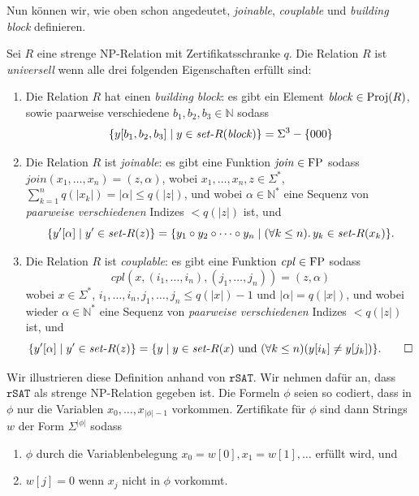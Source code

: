 Nun können wir, wie oben schon angedeutet, \emph{joinable}, \emph{couplable} und \emph{building block} definieren.
\begin{definition}\label{def:universal}
    Sei $R$ eine strenge NP-Relation mit Zertifikatsschranke $q$.
    Die Relation $R$ ist \emph{universell} wenn alle drei folgenden Eigenschaften erfüllt sind:
    \begin{enumerate}
        \item Die Relation $R$ hat einen \emph{building block}:  es gibt ein Element $\mathit{block}\in\operatorname{Proj}(R)$, sowie paarweise verschiedene $b_1,b_2,b_3\in\mathbb N$ sodass
            \[\{ y[b_1,b_2,b_3] \mid y\in \mathit{set}\text{-}{}R(\mathit{block}) \} = \Sigma^3 - \{000\} \]
        \item Die Relation $R$ ist \emph{joinable}: es gibt eine Funktion $\mathit{join}\in \mathrm{FP}$ sodass
           $ \mathit{join}(x_1, \dots, x_n) = (z, \alpha)$, wobei $x_1, \ldots, x_n, z\in \Sigma^*$, $\sum_{k=1}^n q(|x_k|)=|\alpha|\leq q(|z|)$, und
            wobei $\alpha\in \mathbb N^*$ eine Sequenz von \emph{paarweise verschiedenen} Indizes $<q(|z|)$ ist, und
            \begin{equation*} \{ y'[\alpha] \mid y' \in \mathit{set}\text{-}{}R(z)\} = \{ y_1\circ y_2 \circ \cdots \circ y_n \mid (\forall k\leq n).\, y_k \in \mathit{set}\text{-}{}R(x_k) \}. \end{equation*}
        \item Die Relation $R$ ist \emph{couplable}: es gibt eine Funktion $\mathit{cpl}\in \mathrm{FP}$ sodass
            \[  \mathit{cpl}(x, (i_1, \ldots, i_n), (j_1, \ldots, j_n)) = (z, \alpha) \]
        wobei $x\in\Sigma^*$, $i_1, \ldots, i_n, j_1,\ldots, j_n \leq q(|x|)-1$ und $|\alpha|=q(|x|)$, und
            wobei wieder $\alpha\in \mathbb N^*$ eine Sequenz von \emph{paarweise verschiedenen} Indizes $<q(|z|)$ ist, und
            \begin{equation*} \{ y'[\alpha] \mid y'\in \mathit{set}\text{-}{}R(z) \} = \{ y \mid y\in \mathit{set}\text{-}{}R(x) \text{ und } (\forall k\leq n)(y[i_k]\neq y[j_k]) \}. \qedhere \end{equation*}
    \end{enumerate}
\end{definition}
Wir illustrieren diese Definition anhand von $\mathtt{rSAT}$. 
Wir nehmen dafür an, dass $\mathtt{rSAT}$ als strenge NP-Relation gegeben ist. Die Formeln $\phi$ seien so codiert, dass in $\phi$ nur die Variablen $x_0, \dots, x_{|\phi|-1}$ vorkommen.
Zertifikate für $\phi$ sind dann Strings $w$ der Form $\Sigma^{|\phi|}$ sodass 
\begin{enumerate}[nosep]
    \item $\phi$ durch die Variablenbelegung $x_0=w[0], x_1=w[1], \dots$ erfüllt wird, und
    \item $w[j]=0$ wenn $x_j$ nicht in $\phi$ vorkommt.
\end{enumerate}

